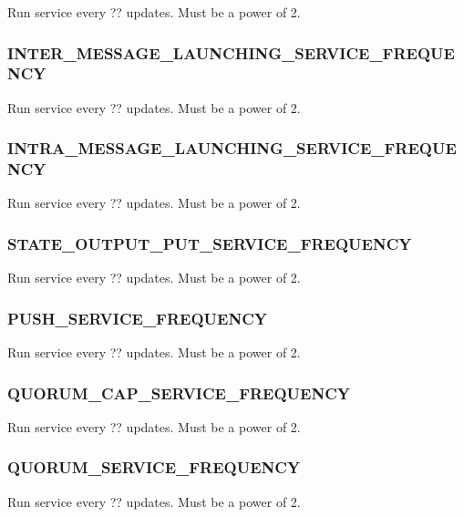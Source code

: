 
Run service every ?? updates.
Must be a power of 2.

\subsubsection{INTER\_MESSAGE\_LAUNCHING\_SERVICE\_FREQUENCY}


Run service every ?? updates.
Must be a power of 2.

\subsubsection{INTRA\_MESSAGE\_LAUNCHING\_SERVICE\_FREQUENCY}


Run service every ?? updates.
Must be a power of 2.

\subsubsection{STATE\_OUTPUT\_PUT\_SERVICE\_FREQUENCY}


Run service every ?? updates.
Must be a power of 2.

\subsubsection{PUSH\_SERVICE\_FREQUENCY}


Run service every ?? updates.
Must be a power of 2.

\subsubsection{QUORUM\_CAP\_SERVICE\_FREQUENCY}


Run service every ?? updates.
Must be a power of 2.

\subsubsection{QUORUM\_SERVICE\_FREQUENCY}


Run service every ?? updates.
Must be a power of 2.

